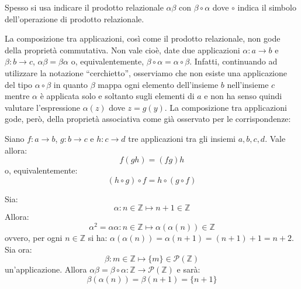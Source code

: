 Spesso si usa indicare il prodotto relazionale $\alpha \beta$ con $\beta \circ \alpha$ dove $\circ$ indica il simbolo dell'operazione di prodotto relazionale.

La composizione tra applicazioni, così come il prodotto relazionale, non gode della proprietà commutativa. Non vale cioè, date due applicazioni $\alpha: a \rightarrow b$ e $\beta: b \rightarrow c$, $\alpha \beta = \beta \alpha$ o, equivalentemente, $\beta \circ \alpha = \alpha \circ \beta$. Infatti, continuando ad utilizzare la notazione ``cerchietto'', osserviamo che non esiste una applicazione del tipo $\alpha \circ \beta$ in quanto $\beta$ mappa ogni elemento dell'insieme $b$ nell'insieme $c$ mentre $\alpha$ è applicata solo e soltanto sugli elementi di $a$ e non ha senso quindi valutare l'espressione $\alpha (z)$ dove $z=g(y)$. La composizione tra applicazioni gode, però, della proprietà associativa come già osservato per le corrispondenze:


\begin{propbox}
	Siano $f: a \rightarrow b$, $g: b \rightarrow c$ e $h: c \rightarrow d$ tre applicazioni tra gli insiemi $a,b,c,d$. Vale allora:
	\begin{equation}
		f(gh)=(fg)h
	\end{equation}
	o, equivalentemente:
	\begin{equation}
		(h \circ g) \circ f = h \circ (g \circ f)
	\end{equation}
	
\end{propbox}

\begin{example}
	Sia:
	\begin{displaymath}
		\alpha: n \in \mathbb{Z} \mapsto n+1 \in \mathbb{Z}
	\end{displaymath}
	Allora:
	\begin{displaymath}
		\alpha^{2} = \alpha \alpha: n \in \mathbb{Z} \mapsto \alpha (\alpha(n)) \in \mathbb{Z}
	\end{displaymath}
	ovvero, per ogni $n \in \mathbb{Z}$ si ha: $\alpha (\alpha(n)) = \alpha(n+1)= (n+1)+1=n+2$. Sia ora:
	\begin{displaymath}
		\beta: m \in \mathbb{Z} \mapsto \{m\} \in \mathcal{P}(\mathbb{Z})
	\end{displaymath}
	un'applicazione. Allora $\alpha\beta= \beta \circ \alpha: \mathbb{Z} \longrightarrow \mathcal{P}(\mathbb{Z})$ e sarà:
	\begin{displaymath}
		\beta(\alpha(n))=\beta(n+1)=\{n+1\}
	\end{displaymath}
\end{example}

